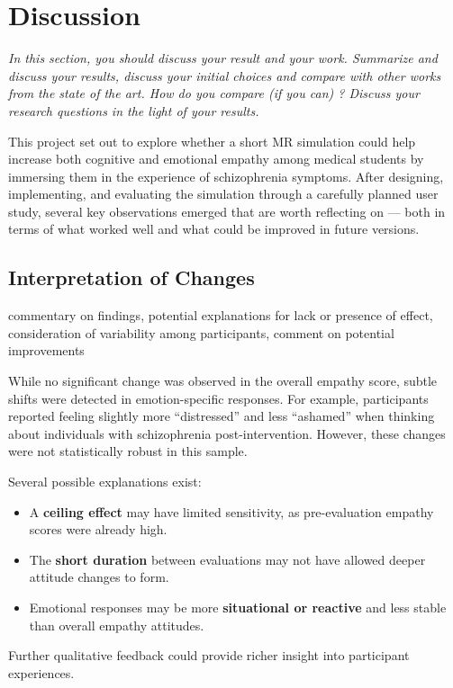 \chapter{Discussion}
\label{ch:discussion}

\emph{In this section, you should discuss your result and your work. Summarize and discuss your results,  discuss your initial choices and compare with other works from the state of the art. How do you compare (if you can) ? Discuss your research questions in the light of your results. }

This project set out to explore whether a short MR simulation could help increase both cognitive and emotional empathy among medical students by immersing them in the experience of schizophrenia symptoms. After designing, implementing, and evaluating the simulation through a carefully planned user study, several key observations emerged that are worth reflecting on — both in terms of what worked well and what could be improved in future versions.

\section{Interpretation of Changes}

commentary on findings, potential explanations for lack or presence of effect, consideration of variability among participants, comment on potential improvements


While no significant change was observed in the overall empathy score, subtle shifts were detected in emotion-specific responses. For example, participants reported feeling slightly more “distressed” and less “ashamed” when thinking about individuals with schizophrenia post-intervention. However, these changes were not statistically robust in this sample.

Several possible explanations exist:
\begin{itemize}
  \item A \textbf{ceiling effect} may have limited sensitivity, as pre-evaluation empathy scores were already high.
  \item The \textbf{short duration} between evaluations may not have allowed deeper attitude changes to form.
  \item Emotional responses may be more \textbf{situational or reactive} and less stable than overall empathy attitudes.
\end{itemize}

Further qualitative feedback could provide richer insight into participant experiences.



